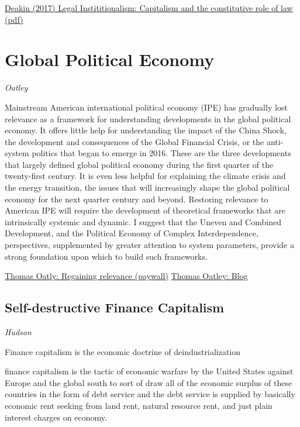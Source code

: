 \documentclass[
]{book}
\begin{document}
\href{https://www.sciencedirect.com/science/article/pii/S0147596716300087}{Deakin (2017) Legal Instititionalism: Capitalism and the constitutive role of law}
\href{pdf/Deakin_2017_Capitalism_and_Law.pdf}{(pdf)}

\hypertarget{global-political-economy}{%
\chapter{Global Political Economy}\label{global-political-economy}}

\emph{Oatley}

Mainstream American international political economy (IPE) has gradually lost relevance as a framework for understanding developments in the global political economy. It offers little help for understanding the impact of the China Shock, the development and consequences of the Global Financial Crisis, or the anti-system politics that began to emerge in 2016. These are the three developments that largely defined global political economy during the first quarter of the twenty-first century. It is even less helpful for explaining the climate crisis and the energy transition, the issues that will increasingly shape the global political economy for the next quarter century and beyond. Restoring relevance to American IPE will require the development of theoretical frameworks that are intrinsically systemic and dynamic. I suggest that the Uneven and Combined Development, and the Political Economy of Complex Interdependence, perspectives, supplemented by greater attention to system parameters, provide a strong foundation upon which to build such frameworks.

\href{https://www.tandfonline.com/doi/abs/10.1080/09557571.2021.1888880?journalCode=ccam20}{Thomas Oatly: Regaining relevance (paywall)}
\href{https://www.thomasoatley.org/blog/}{Thomas Oatley: Blog}

\hypertarget{self-destructive-finance-capitalism}{%
\section{Self-destructive Finance Capitalism}\label{self-destructive-finance-capitalism}}

\emph{Hudson}

Finance capitalism is the economic doctrine of deindustrialization

finance capitalism is the tactic of economic warfare by the
United States against Europe and the global south to sort of draw all of
the economic surplus of these countries in the form of debt service
and the debt service is supplied by basically economic rent seeking
from land rent, natural resource rent, and just plain interest charges
on economy.
\end{document}
